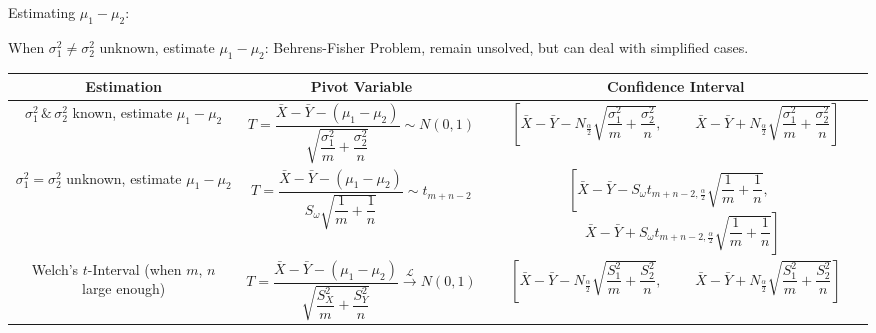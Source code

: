 \begin{enumerate}
    Estimating $\mu_1-\mu_2$:
    
    When $\sigma_1^2\neq\sigma^2_2$ unknown, estimate $\mu_1-\mu_2$: Behrens-Fisher Problem, remain unsolved, but can deal with simplified cases. 

    \begin{table}[htbp]
        \centering
        \renewcommand\arraystretch{2.2}
        \begin{tabular}{|c|c|c|}
            \hline
            Estimation& Pivot Variable & Confidence Interval\\
            \hline
            \makecell{$\sigma_1^2\,\&\,\sigma_2^2$ known,\\estimate $\mu_1-\mu_2$}&$ T=\dfrac{\bar{X}-\bar{Y}-(\mu_1-\mu_2)}{\sqrt{\dfrac{\sigma_1^2}{m}+\dfrac{\sigma^2_2}{n}}}\sim N(0,1)$&\makecell{$\left[\bar{X}-\bar{Y}-N_{\frac{\alpha}{2}}\sqrt{\dfrac{\sigma_1^2}{m}+\dfrac{\sigma_2^2}{n}},\right.\quad $\\$\quad\left.\bar{X}-\bar{Y}+N_{\frac{\alpha}{2}}\sqrt{\dfrac{\sigma_1^2}{m}+\dfrac{\sigma_2^2}{n}}   \right]$}\\
            \hline
            \makecell{$\sigma_1^2=\sigma^2_2$ unknown,\\estimate $\mu_1-\mu_2$}&$T=\dfrac{\bar{X}-\bar{Y}-(\mu_1-\mu_2)}{S_\omega\sqrt{\dfrac{1}{m}+\dfrac{1}{n}}}\sim t_{m+n-2}$&\makecell{$\left[\bar{X}-\bar{Y}-S_\omega t_{m+n-2,\frac{\alpha}{2}}\sqrt{\dfrac{1}{m}+\dfrac{1}{n}}\right.,\quad $\\$\left.\quad\bar{X}-\bar{Y}+S_\omega t_{m+n-2,\frac{\alpha}{2}}\sqrt{\dfrac{1}{m}+\dfrac{1}{n}} \right]$}\\
            \hline
            \makecell{Welch's $t$-Interval\\(when $m$, $n$ large enough)}&$T=\dfrac{\bar{X}-\bar{Y}-(\mu_1-\mu_2)}{\sqrt{\dfrac{S_X^2}{m}+\dfrac{S^2_Y}{n}}}\xrightarrow[]{\mathscr{L}} N(0,1)$&\makecell{$\left[\bar{X}-\bar{Y}-N_{\frac{\alpha}{2}}\sqrt{\dfrac{S_1^2}{m}+\dfrac{S_2^2}{n}}\right.,\quad$\\$\quad\left.\bar{X}-\bar{Y}+N_{\frac{\alpha}{2}}\sqrt{\dfrac{S_1^2}{m}+\dfrac{S_2^2}{n}}\right]$}\\
            \hline
        \end{tabular}
    \end{table}


\end{enumerate}
